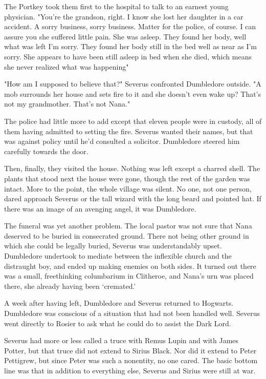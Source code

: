 The Portkey took them first to the hospital to talk to an earnest young physician. "You're the grandson, right. I know she lost her daughter in a car accident. A sorry business, sorry business. Matter for the police, of course. I can assure you she suffered little pain. She was asleep. They found her body, well what was left{\el} I'm sorry. They found her body still in the bed{\el} well as near as{\el} I'm sorry. She appears to have been still asleep in bed when she died, which means she never realized what was happening{\el}"

"How am I supposed to believe that?" Severus confronted Dumbledore outside. "A mob surrounds her house and sets fire to it and she doesn't even wake up? That's not my grandmother. That's not Nana."

The police had little more to add except that eleven people were in custody, all of them having admitted to setting the fire. Severus wanted their names, but that was against policy until he'd consulted a solicitor. Dumbledore steered him carefully towards the door.

Then, finally, they visited the house. Nothing was left except a charred shell. The plants that stood next the house were gone, though the rest of the garden was intact. More to the point, the whole village was silent. No one, not one person, dared approach Severus or the tall wizard with the long beard and pointed hat. If there was an image of an avenging angel, it was Dumbledore.

The funeral was yet another problem. The local pastor was not sure that Nana deserved to be buried in consecrated ground. There not being other ground in which she could be legally buried, Severus was understandably upset. Dumbledore undertook to mediate between the inflexible church and the distraught boy, and ended up making enemies on both sides. It turned out there was a small, freethinking columbarium in Clitheroe, and Nana's urn was placed there, she already having been `cremated.'

A week after having left, Dumbledore and Severus returned to Hogwarts. Dumbledore was conscious of a situation that had not been handled well. Severus went directly to Rosier to ask what he could do to assist the Dark Lord.

Severus had more or less called a truce with Remus Lupin and with James Potter, but that truce did not extend to Sirius Black. Nor did it extend to Peter Pettigrew, but since Peter was such a nonentity, no one cared. The basic bottom line was that in addition to everything else, Severus and Sirius were still at war.

